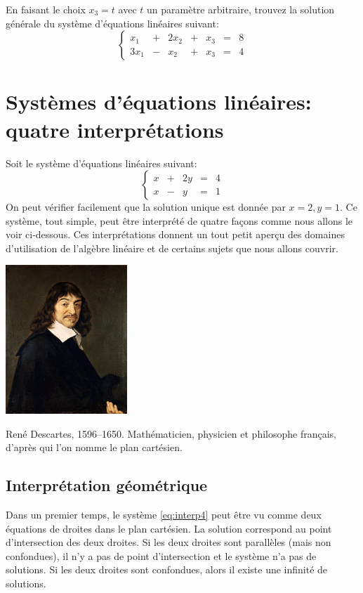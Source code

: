 \begin{exerciceB}
	En faisant le choix $x_3 = t$ avec $t$ un paramètre arbitraire, trouvez la
	solution générale du système d'équations linéaires suivant:
	\[
	\left\{\begin{matrix}
	x_1 &+& 2x_2 &+& x_3 &=& 8 \\
	3x_1 &-& x_2 &+& x_3 &=& 4
	\end{matrix}
	\right.
	\]
\end{exerciceB}


\section{Systèmes d'équations linéaires: quatre interprétations}
Soit le système d'équations linéaires suivant:
\begin{equation}
\left\{
\begin{matrix}
x &+&2y &=& 4 \\
x &-& y &=& 1 
\end{matrix}
\right.\label{eq:interp4}
\end{equation}
On peut vérifier facilement que la solution unique est donnée par
$x=2, y=1$.
Ce système, tout simple, peut être interprété de quatre façons comme nous
allons le voir ci-dessous.  Ces interprétations donnent un tout petit aperçu
des domaines d'utilisation de l'algèbre linéaire et de certains sujets que
nous allons couvrir.

\begin{marginfigure}
\includegraphics[width=1.8in]{images/descartes.jpg}
\caption{René Descartes, 1596--1650.  Mathématicien, physicien et philosophe français, 
d'après qui l'on nomme le plan cartésien.}\label{image:descartes}
\end{marginfigure}

\subsection{Interprétation géométrique}
Dans un premier temps, le système \eqref{eq:interp4} peut être vu comme
deux équations de droites dans le plan cartésien.
La solution correspond au point d'intersection des deux droites.  Si les deux
droites sont parallèles (mais non confondues), il n'y a pas de point d'intersection
et le système n'a pas de solutions.  Si les deux droites sont confondues, alors
il existe une infinité de solutions.

